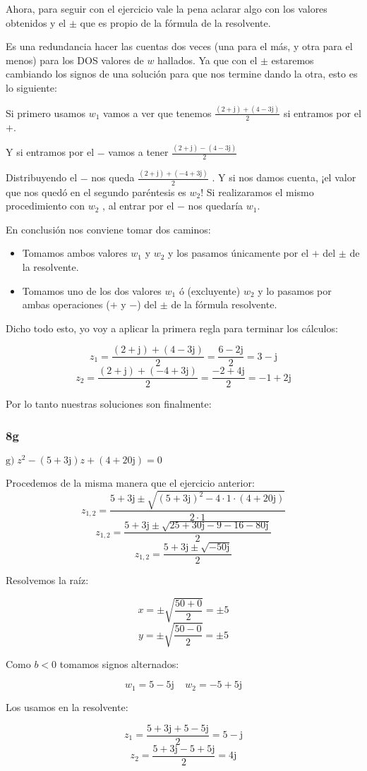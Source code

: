 \documentclass[11pt]{article}
\def\imj{\mathrm{j}}
\begin{document}
	Ahora, para seguir con el ejercicio vale la pena aclarar algo con los valores obtenidos y el $\pm$ que es propio de la fórmula de la resolvente. 
	
	Es una redundancia hacer las cuentas dos veces (una para el más, y otra para el menos) para los DOS valores de $w$ hallados. Ya que con el $\pm$ estaremos cambiando los signos de una solución para que nos termine dando la otra, esto es lo siguiente:
	
	\begin{center}
		Si primero usamos $w_{1}$ vamos a ver que tenemos $\displaystyle{\frac{(2+\imj)+(4-3\imj)}{2}}$ si entramos por el $+$.
		
		Y si entramos por el $-$ vamos a tener $\displaystyle{\frac{(2+\imj)-(4-3\imj)}{2}}$
		
		Distribuyendo el $-$ nos queda $\displaystyle{\frac{(2+\imj)+(-4+3\imj)}{2}}$ . Y si nos damos cuenta, ¡el valor que nos quedó en el segundo paréntesis es $w_{2}$! Si realizaramos el mismo procedimiento con $w_{2}$ , al entrar por el $-$ nos quedaría $w_{1}$.
	\end{center}
	En conclusión nos conviene tomar dos caminos:
	\begin{itemize}
		\item Tomamos ambos valores $w_{1}$ y $w_{2}$ y los pasamos únicamente por el $+$ del $\pm$ de la resolvente.
		\item Tomamos uno de los dos valores $w_{1}$ ó (excluyente) $w_{2}$ y lo pasamos por ambas operaciones ($+$ y $-$) del $\pm$ de la fórmula resolvente.
	\end{itemize}
	
	Dicho todo esto, yo voy a aplicar la primera regla para terminar los cálculos:
	
	$$z_{1}=\frac{(2+\imj)+(4-3\imj)}{2}=\frac{6-2\imj}{2}=3-\imj$$
	$$z_{2}=\frac{(2+\imj)+(-4+3\imj)}{2}=\frac{-2+4\imj}{2}=-1+2\imj$$
	
	Por lo tanto nuestras soluciones son finalmente:
	\fcolorbox{black}{yellow}{$z_{1}=3-\imj\;\;\;\;z_{2}=-1+2\imj$}
	
	\subsubsection{8g}
	$\mathrm{g)} \; z^{2}-(5+3\imj)z+(4+20\imj)=0$
	
	Procedemos de la misma manera que el ejercicio anterior:
	$$\displaystyle{z_{1,2}=\frac{5+3\imj \pm \sqrt{(5+3\imj)^2-4\cdot 1 \cdot (4+20\imj)}}{2\cdot 1}}$$
	$$\displaystyle{z_{1,2}=\frac{5+3\imj \pm \sqrt{25+30\imj-9 -16-80\imj}}{2}}$$
	$$\displaystyle{z_{1,2}=\frac{5+3\imj \pm \sqrt{-50\imj}}{2}}$$
	\begin{center}
		Resolvemos la raíz:
	\end{center}
	$$x=\pm \sqrt{\frac{50+0}{2}}=\pm5$$
	$$y=\pm \sqrt{\frac{50-0}{2}}=\pm5$$
	\begin{center}
		Como $b<0$ tomamos signos alternados:
	\end{center}
	$$w_{1}=5-5\imj\;\;\;\;w_{2}=-5+5\imj$$
	\begin{center}
		Los usamos en la resolvente:
	\end{center}
	$$z_{1}=\frac{5+3\imj+5-5\imj}{2}=5-\imj$$
	$$z_{2}=\frac{5+3\imj-5+5\imj}{2}=4\imj$$
	
\end{document}
